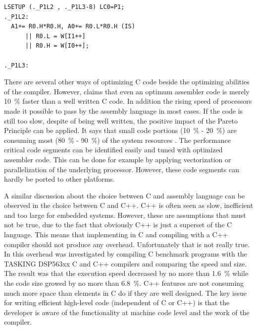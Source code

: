 \begin{lstlisting}[caption=Optimized assembler code,label=opt_ass_01]
LSETUP (._P1L2 , ._P1L3-8) LC0=P1;
._P1L2:
  A1+= R0.H*R0.H, A0+= R0.L*R0.H (IS)
      || R0.L = W[I1++]
      || R0.H = W[I0++];
			
._P1L3:
\end{lstlisting}

There are several other ways of optimizing C code beside the optimizing abilities of the compiler. However, \cite{lee_opt_C} claims that even an optimum assembler code is merely \SI{10}{\%} faster than a well written C code. In addition the rising speed of processors made it possible to pass by the assembly language in most cases. If the code is still too slow, despite of being well written, the positive impact of the Pareto Principle can be applied. It says that small code portions (\SI{10}{\%} - \SI{20}{\%}) are consuming most (\SI{80}{\%} - \SI{90}{\%}) of the system resources \cite{pareto}. The performance critical code segments can be identified easily and tuned with optimized assembler code. This can be done for example by applying vectorization or parallelization of the underlying processor. However, these code segments can hardly be ported to other platforms.

A similar discussion about the choice between C and assembly language can be observed in the choice between C and C++. C++ is often seen as slow, inefficient and too large for embedded systems. However, these are assumptions that must not be true, due to the fact that obviously C++ is just a superset of the C language. This means that implementing in C and compiling with a C++ compiler should not produce any overhead. Unfortunately that is not really true. In \cite{dsp_high_level} this overhead was investigated by compiling C benchmark programs with the TASKING DSP563xx C and C++ compilers and comparing the speed and size. The result was that the execution speed decreased by no more than \SI{1.6}{\%} while the code size growed by no more than \SI{6.8}{\%}. C++ features are not consuming much more space than elements in C do if they are well designed. The key issue for writing efficient high-level code (independent of C or C++) is that the developer is aware of the functionality at machine code level and the work of the compiler.

